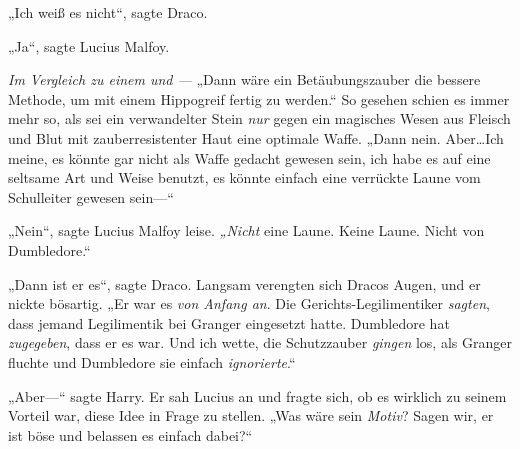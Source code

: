 „Ich weiß es nicht“, sagte Draco.

„Ja“, sagte Lucius Malfoy.

\emph{Im Vergleich zu einem  und —}
„Dann wäre ein Betäubungszauber die bessere Methode, um mit einem Hippogreif fertig zu werden.“
So gesehen schien es immer mehr so, als sei ein verwandelter Stein \emph{nur} gegen ein magisches Wesen aus Fleisch und Blut mit zauberresistenter Haut eine optimale Waffe.
„Dann nein. Aber…Ich meine, es könnte gar nicht als Waffe gedacht gewesen sein, ich habe es auf eine seltsame Art und Weise benutzt, es könnte einfach eine verrückte Laune vom Schulleiter gewesen sein—“

„Nein“, sagte Lucius Malfoy leise. \emph{„Nicht} eine Laune. Keine Laune. Nicht von Dumbledore.“

„Dann ist er es“, sagte Draco.
Langsam verengten sich Dracos Augen, und er nickte bösartig.
„Er war es \emph{von Anfang an}. Die Gerichts-Legilimentiker \emph{sagten}, dass jemand Legilimentik bei Granger eingesetzt hatte. Dumbledore hat \emph{zugegeben}, dass er es war. Und ich wette, die Schutzzauber \emph{gingen} los, als Granger fluchte und Dumbledore sie einfach \emph{ignorierte}.“

„Aber—“ sagte Harry. Er sah Lucius an und fragte sich, ob es wirklich zu seinem Vorteil war, diese Idee in Frage zu stellen. „Was wäre sein \emph{Motiv}? Sagen wir, er ist böse und belassen es einfach dabei?“

